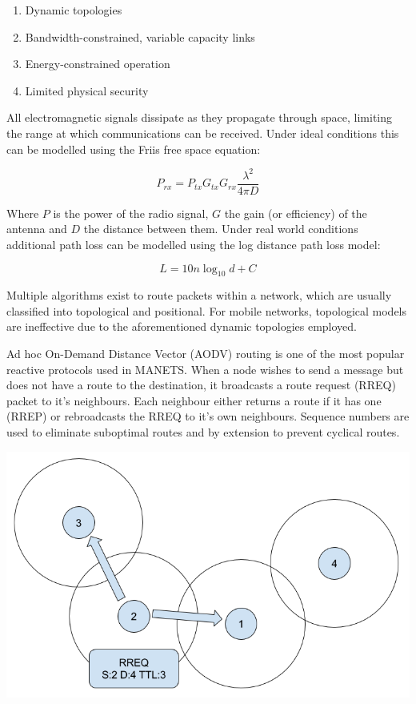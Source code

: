 \documentclass[landscape,a0paper,fontscale=0.285]{baposter} %
\newcommand{\compresslist}{ %
\setlength{\itemsep}{1pt}
\setlength{\parskip}{0pt}
\setlength{\parsep}{0pt}
}
\begin{document}
\begin{poster}
{\begin{multicols}{2}
\begin{enumerate}\compresslist
\item Dynamic topologies
\item Bandwidth-constrained, variable capacity links
\item Energy-constrained operation
\item Limited physical security
\end{enumerate}

All electromagnetic signals dissipate as they propagate through space, limiting the range at which communications can be received. Under ideal conditions this can be modelled using the Friis free space equation:

\begin{equation}
P_{rx} = P_{tx}G_{tx}G_{rx}\frac{\lambda^2}{4{\pi}D}
\label{friis}
\end{equation} 

Where $P$ is the power of the radio signal, $G$ the gain (or efficiency) of the antenna and $D$ the distance between them. Under real world conditions additional path loss can be modelled  using the log distance path loss model:

\begin{equation}
L = 10n {\log_{10}}d + C
\end{equation}

Multiple algorithms exist to route packets within a network, which are usually classified into topological and positional. For mobile networks, topological models are ineffective due to the aforementioned dynamic topologies employed.
\newline

Ad hoc On-Demand Distance Vector (AODV) routing is one of the most popular reactive protocols used in MANETS\cite{perkins2003ad}. When a node wishes to send a message but does not have a route to the destination, it broadcasts a route request (RREQ) packet to it's neighbours. Each neighbour either returns a route if it has one (RREP) or rebroadcasts the RREQ to it's own neighbours. Sequence numbers are used to eliminate suboptimal routes and by extension to prevent cyclical routes.

\includegraphics[scale=0.25]{figures/aodv-1}


\end{multicols}}
\end{poster}
\end{document}
